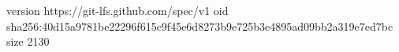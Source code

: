 version https://git-lfs.github.com/spec/v1
oid sha256:40d15a9781be22296f615c9f45e6d8273b9e725b3e4895ad09bb2a319e7ed7bc
size 2130
